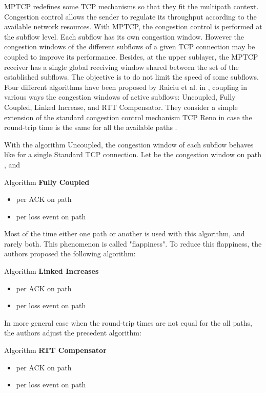 \documentclass{sig-alternate}
\begin{document}
MPTCP redefines some TCP mechanisms so that they fit the multipath context. 
Congestion control allows the sender to regulate its throughput according to the available network resources. 
With MPTCP, the congestion control is performed at the subflow level. Each subflow has its own congestion window. However the congestion windows of the different subflows of a given TCP connection may be coupled to improve its performance. 
Besides, at the upper sublayer, the MPTCP receiver has a  single global receiving window shared between the set of the established subflows. The objective is to do not limit the speed of some subflows.
Four different algorithms have been proposed by Raiciu et al. in \cite{raiciu09}, coupling in various ways the congestion windows of active subflows: Uncoupled, Fully Coupled, Linked Increase, and RTT Compensator. They consider a simple extension of the standard congestion control mechanism TCP Reno  in case the round-trip time is the same for all the available paths . 

With the algorithm Uncoupled, the congestion window of each subflow behaves like for a single Standard TCP connection. 
Let  be the congestion window on path , and 

Algorithm {\bf Fully Coupled}
\begin{itemize}
\item  per ACK on path 
\item  per loss event on path 
\end{itemize}

Most of the time either one path or another is used with this algorithm, and rarely both. This phenomenon is called "flappiness". To reduce this flappiness, the authors proposed the following algorithm:

Algorithm {\bf Linked Increases} \cite{raiciu10}
\begin{itemize}
\item  per ACK on path 
\item  per loss event on path 
\end{itemize}

In more general case when the round-trip times are not equal for the all paths, the authors adjust the precedent algorithm:

Algorithm {\bf RTT Compensator}
\begin{itemize}
\item  per ACK on path 
\item  per loss event on path 
\end{itemize}
\end{document}
